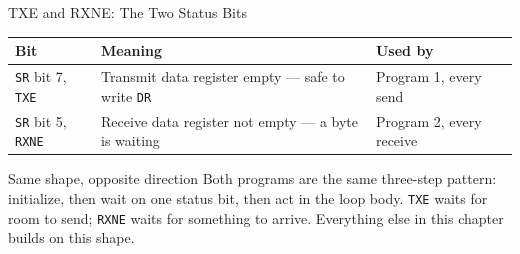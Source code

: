\documentclass[9pt,aspectratio=169,xcolor=table]{beamer}
\begin{document}
\begin{frame}{TXE and RXNE: The Two Status Bits}
	\begin{center}
	\end{center}

	\vspace{5mm}

	\begin{center}
		{\small
			\striped
			\begin{tabular}{@{}l l R{.42\textwidth}@{}}
				\toprule
				\textbf{Bit} & \textbf{Meaning} & \textbf{Used by} \\
				\midrule
				\texttt{SR} bit 7, \texttt{TXE} &
				Transmit data register empty --- safe to write \texttt{DR} &
				Program 1, every send \\

				\texttt{SR} bit 5, \texttt{RXNE} &
				Receive data register not empty --- a byte is waiting &
				Program 2, every receive \\
				\bottomrule
			\end{tabular}
		}
	\end{center}

	\vspace{2mm}

	\begin{block}{Same shape, opposite direction}
		Both programs are the same three-step pattern: \alert{initialize}, then
		\alert{wait} on one status bit, then \alert{act} in the loop body.
		\texttt{TXE} waits for room to send; \texttt{RXNE} waits for something
		to arrive. Everything else in this chapter builds on this shape.
	\end{block}
\end{frame}
\end{document}
